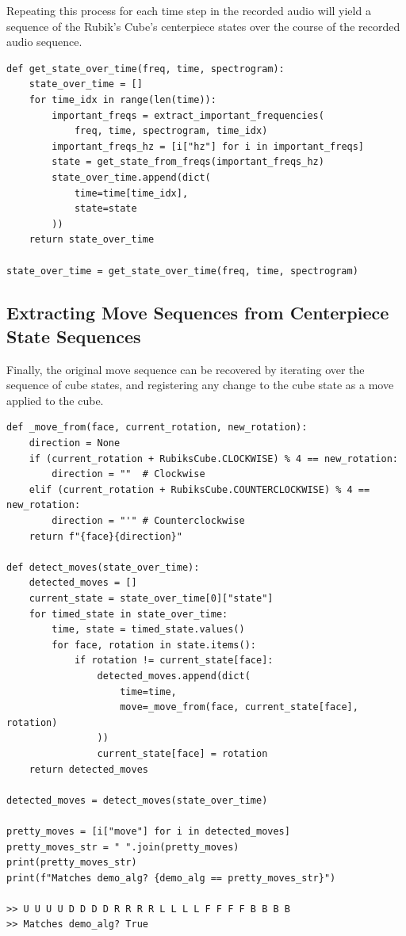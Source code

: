 Repeating this process for each time step in the recorded audio will yield a sequence of the Rubik's Cube's centerpiece states over the course of the recorded audio sequence.

\begin{verbatim}
def get_state_over_time(freq, time, spectrogram):
    state_over_time = []
    for time_idx in range(len(time)):
        important_freqs = extract_important_frequencies(
            freq, time, spectrogram, time_idx)
        important_freqs_hz = [i["hz"] for i in important_freqs]
        state = get_state_from_freqs(important_freqs_hz)
        state_over_time.append(dict(
            time=time[time_idx],
            state=state
        ))
    return state_over_time

state_over_time = get_state_over_time(freq, time, spectrogram)
\end{verbatim}

\newpage
\subsection{Extracting Move Sequences from Centerpiece State Sequences}
\label{subsec:extract-moves}
Finally, the original move sequence can be recovered by iterating over the sequence of cube states, and registering any change to the cube state as a move applied to the cube.

\begin{verbatim}
def _move_from(face, current_rotation, new_rotation):
    direction = None
    if (current_rotation + RubiksCube.CLOCKWISE) % 4 == new_rotation:
        direction = ""  # Clockwise
    elif (current_rotation + RubiksCube.COUNTERCLOCKWISE) % 4 == new_rotation:
        direction = "'" # Counterclockwise
    return f"{face}{direction}"

def detect_moves(state_over_time):
    detected_moves = []
    current_state = state_over_time[0]["state"]
    for timed_state in state_over_time:
        time, state = timed_state.values()
        for face, rotation in state.items():
            if rotation != current_state[face]:
                detected_moves.append(dict(
                    time=time,
                    move=_move_from(face, current_state[face], rotation)
                ))
                current_state[face] = rotation
    return detected_moves

detected_moves = detect_moves(state_over_time)

pretty_moves = [i["move"] for i in detected_moves]
pretty_moves_str = " ".join(pretty_moves)
print(pretty_moves_str)   
print(f"Matches demo_alg? {demo_alg == pretty_moves_str}") 

>> U U U U D D D D R R R R L L L L F F F F B B B B
>> Matches demo_alg? True
\end{verbatim}

